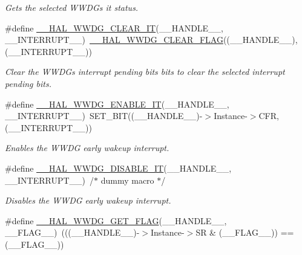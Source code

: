 \begin{DoxyCompactItemize}
\begin{DoxyCompactList}\small\item\em Gets the selected W\+W\+DG\textquotesingle{}s it status. \end{DoxyCompactList}\item 
\#define \hyperlink{group___w_w_d_g___exported___macros_ga8b36c9e3cea69d4463ca8483233bfef8}{\+\_\+\+\_\+\+H\+A\+L\+\_\+\+W\+W\+D\+G\+\_\+\+C\+L\+E\+A\+R\+\_\+\+IT}(\+\_\+\+\_\+\+H\+A\+N\+D\+L\+E\+\_\+\+\_\+,  \+\_\+\+\_\+\+I\+N\+T\+E\+R\+R\+U\+P\+T\+\_\+\+\_\+)~\hyperlink{group___w_w_d_g___exported___macros_gae9c3b916e244deffc6a673d97df63671}{\+\_\+\+\_\+\+H\+A\+L\+\_\+\+W\+W\+D\+G\+\_\+\+C\+L\+E\+A\+R\+\_\+\+F\+L\+AG}((\+\_\+\+\_\+\+H\+A\+N\+D\+L\+E\+\_\+\+\_\+), (\+\_\+\+\_\+\+I\+N\+T\+E\+R\+R\+U\+P\+T\+\_\+\+\_\+))
\begin{DoxyCompactList}\small\item\em Clear the W\+W\+DG\textquotesingle{}s interrupt pending bits bits to clear the selected interrupt pending bits. \end{DoxyCompactList}\item 
\#define \hyperlink{group___w_w_d_g___exported___macros_ga62d4eb6a7921d6f729e7a69448eac38a}{\+\_\+\+\_\+\+H\+A\+L\+\_\+\+W\+W\+D\+G\+\_\+\+E\+N\+A\+B\+L\+E\+\_\+\+IT}(\+\_\+\+\_\+\+H\+A\+N\+D\+L\+E\+\_\+\+\_\+,  \+\_\+\+\_\+\+I\+N\+T\+E\+R\+R\+U\+P\+T\+\_\+\+\_\+)~S\+E\+T\+\_\+\+B\+IT((\+\_\+\+\_\+\+H\+A\+N\+D\+L\+E\+\_\+\+\_\+)-\/$>$Instance-\/$>$C\+FR, (\+\_\+\+\_\+\+I\+N\+T\+E\+R\+R\+U\+P\+T\+\_\+\+\_\+))
\begin{DoxyCompactList}\small\item\em Enables the W\+W\+DG early wakeup interrupt. \end{DoxyCompactList}\item 
\#define \hyperlink{group___w_w_d_g___exported___macros_ga671198c3218a1ea746026e69e20911c8}{\+\_\+\+\_\+\+H\+A\+L\+\_\+\+W\+W\+D\+G\+\_\+\+D\+I\+S\+A\+B\+L\+E\+\_\+\+IT}(\+\_\+\+\_\+\+H\+A\+N\+D\+L\+E\+\_\+\+\_\+,  \+\_\+\+\_\+\+I\+N\+T\+E\+R\+R\+U\+P\+T\+\_\+\+\_\+)~/$\ast$ dummy  macro $\ast$/
\begin{DoxyCompactList}\small\item\em Disables the W\+W\+DG early wakeup interrupt. \end{DoxyCompactList}\item 
\#define \hyperlink{group___w_w_d_g___exported___macros_ga60a99447a00a7d95c18637c38147063a}{\+\_\+\+\_\+\+H\+A\+L\+\_\+\+W\+W\+D\+G\+\_\+\+G\+E\+T\+\_\+\+F\+L\+AG}(\+\_\+\+\_\+\+H\+A\+N\+D\+L\+E\+\_\+\+\_\+,  \+\_\+\+\_\+\+F\+L\+A\+G\+\_\+\+\_\+)~(((\+\_\+\+\_\+\+H\+A\+N\+D\+L\+E\+\_\+\+\_\+)-\/$>$Instance-\/$>$SR \& (\+\_\+\+\_\+\+F\+L\+A\+G\+\_\+\+\_\+)) == (\+\_\+\+\_\+\+F\+L\+A\+G\+\_\+\+\_\+))

\end{DoxyCompactItemize}
